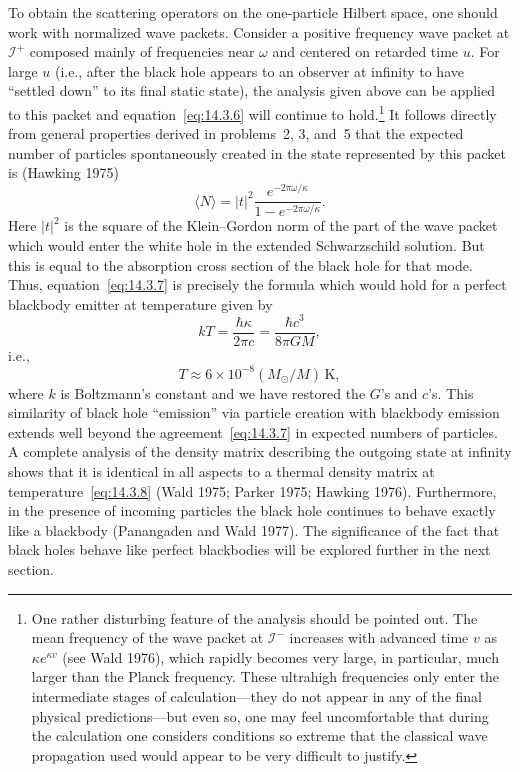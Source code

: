 To obtain the scattering operators on the one-particle Hilbert space, one should work
with normalized wave packets. Consider a positive frequency wave packet at
\(\mathcal I^+\) composed mainly of frequencies near \(\omega\) and centered on
retarded time \(u\). For large \(u\) (i.e., after the black hole appears to an observer
at infinity to have ``settled down'' to its final static state), the analysis given above
can be applied to this packet and equation~\eqref{eq:14.3.6} will continue to
hold.\footnote{One rather disturbing feature of the analysis should be pointed out.
The mean frequency of the wave packet at \(\mathcal I^-\) increases with advanced
time \(v\) as \(\kappa e^{\kappa v}\) (see Wald 1976), which rapidly becomes very
large, in particular, much larger than the Planck frequency. These ultrahigh
frequencies only enter the intermediate stages of calculation---they do not appear in
any of the final physical predictions---but even so, one may feel uncomfortable that
during the calculation one considers conditions so extreme that the classical wave
propagation used would appear to be very difficult to justify.} It follows directly
from general properties derived in problems~2, 3, and~5 that the expected number of
particles spontaneously created in the state represented by this packet is (Hawking
1975)
\begin{equation}
  \langle N\rangle
  =|t|^2\frac{e^{-2\pi\omega/\kappa}}{1-e^{-2\pi\omega/\kappa}}.
  \tag{14.3.7}\label{eq:14.3.7}
\end{equation}
Here \(|t|^2\) is the square of the Klein--Gordon norm of the part of the wave
packet which would enter the white hole in the extended Schwarzschild solution.
But this is equal to the absorption cross section of the black hole for that mode.
Thus, equation~\eqref{eq:14.3.7} is precisely the formula which would hold for a
perfect blackbody emitter at temperature given by
\begin{equation}
  kT=\frac{\hbar\kappa}{2\pi c}=\frac{\hbar c^3}{8\pi GM},
  \tag{14.3.8}\label{eq:14.3.8}
\end{equation}
i.e.,
\begin{equation}
  T\approx6\times10^{-8}(M_\odot/M)\,\mathrm K,
  \tag{14.3.9}\label{eq:14.3.9}
\end{equation}
where \(k\) is Boltzmann's constant and we have restored the \(G\)'s and \(c\)'s.
This similarity of black hole ``emission'' via particle creation with blackbody
emission extends well beyond the agreement~\eqref{eq:14.3.7} in expected numbers
of particles. A complete analysis of the density matrix describing the outgoing state
at infinity shows that it is identical in all aspects to a thermal density matrix at
temperature~\eqref{eq:14.3.8} (Wald 1975; Parker 1975; Hawking 1976).
Furthermore, in the presence of incoming particles the black hole continues to
behave exactly like a blackbody (Panangaden and Wald 1977). The significance of
the fact that black holes behave like perfect blackbodies will be explored further in
the next section.

